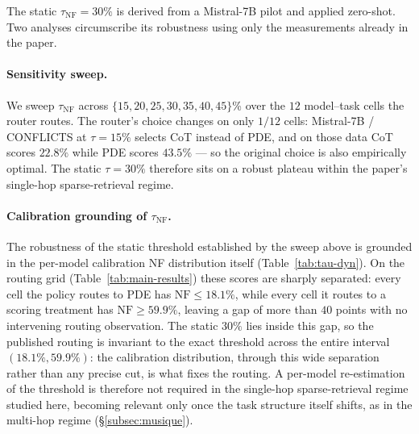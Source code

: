 \documentclass[11pt]{article}
\theoremstyle{definition}
\begin{document}
The static \(\tau_{\text{NF}}=30\%\) is derived from a Mistral-7B pilot and applied zero-shot. Two analyses circumscribe its robustness using only the measurements already in the paper.

\paragraph{Sensitivity sweep.}
We sweep \(\tau_{\text{NF}}\) across \(\{15, 20, 25, 30, 35, 40, 45\}\)\% over the \(12\) model--task cells the router routes. The router's choice changes on only \(1/12\) cells: Mistral-7B / CONFLICTS at \(\tau=15\%\) selects CoT instead of PDE, and on those data CoT scores \(22.8\%\) while PDE scores \(43.5\%\) --- so the original choice is also empirically optimal. The static \(\tau=30\%\) therefore sits on a robust plateau within the paper's single-hop sparse-retrieval regime.

\paragraph{Calibration grounding of \(\tau_{\text{NF}}\).}
The robustness of the static threshold established by the sweep above is grounded in the per-model calibration NF distribution itself (Table~\ref{tab:tau-dyn}). On the routing grid (Table~\ref{tab:main-results}) these scores are sharply separated: every cell the policy routes to PDE has \(\text{NF}\le 18.1\%\), while every cell it routes to a scoring treatment has \(\text{NF}\ge 59.9\%\), leaving a gap of more than \(40\) points with no intervening routing observation. The static \(30\%\) lies inside this gap, so the published routing is invariant to the exact threshold across the entire interval \((18.1\%, 59.9\%)\): the calibration distribution, through this wide separation rather than any precise cut, is what fixes the routing. A per-model re-estimation of the threshold is therefore not required in the single-hop sparse-retrieval regime studied here, becoming relevant only once the task structure itself shifts, as in the multi-hop regime (\S\ref{subsec:musique}).
\end{document}
